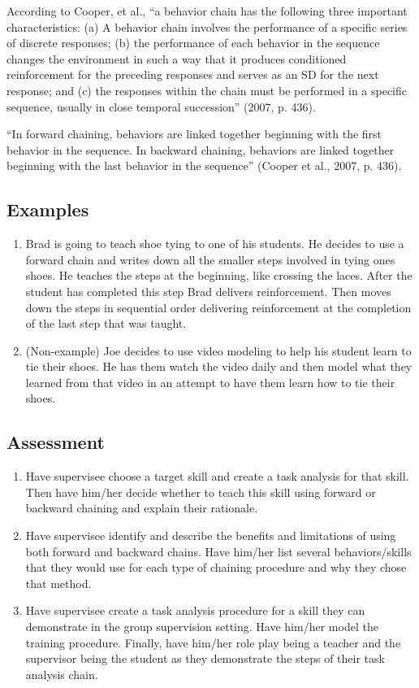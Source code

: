 According to Cooper, et al., ``a behavior chain has the following three important characteristics: (a) A behavior chain involves the performance of a specific series of discrete responses; (b) the performance of each behavior in the sequence changes the environment in such a way that it produces conditioned reinforcement for the preceding responses and serves as an SD  for the next response; and (c) the responses within the chain must be performed in a specific sequence, usually in close temporal succession'' (2007, p. 436).

``In forward chaining, behaviors are linked together beginning with the first behavior in the sequence. In backward chaining, behaviors are linked together beginning with the last behavior in the sequence'' (Cooper et al., 2007, p. 436). 

\subsection{Examples}
\begin{enumerate}
\item     Brad is going to teach shoe tying to one of his students. He decides to use a forward chain and writes down all the smaller steps involved in tying ones shoes. He teaches the steps at the beginning, like crossing the laces. After the student has completed this step Brad delivers reinforcement.  Then moves down the steps in sequential order delivering reinforcement at the completion of the last step that was taught.
%
\item (Non-example) Joe decides to use video modeling to help his student learn to tie their shoes. He has them watch the video daily and then model what they learned from that video in an attempt to have them learn how to tie their shoes.
\end{enumerate}
%
\subsection{Assessment}
\begin{enumerate}
\item Have supervisee choose a target skill and create a task analysis for that skill. Then have him/her decide whether to teach this skill using forward or backward chaining and explain their rationale.
\item Have supervisee identify and describe the benefits and limitations of using both forward and backward chains. Have him/her list several behaviors/skills that they would use for each type of chaining procedure and why they chose that method.
\item Have supervisee create a task analysis procedure for a skill they can demonstrate in the group supervision setting. Have him/her model the training procedure. Finally, have him/her role play being a teacher and the supervisor being the student as they demonstrate the steps of their task analysis chain.
\end{enumerate}
%
